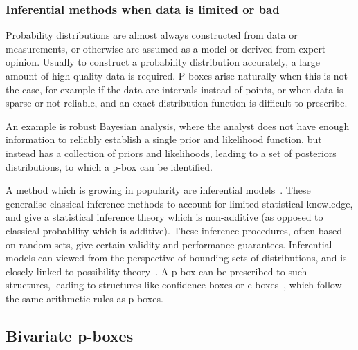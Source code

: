 \documentclass{juliacon}
\begin{document}
\subsubsection{Inferential methods when data is limited or bad}
Probability distributions are almost always constructed from data or measurements, or otherwise are assumed as a model or derived from expert opinion. Usually to construct a probability distribution accurately, a large amount of high quality data is required. P-boxes arise naturally when this is not the case, for example if the data are intervals instead of points, or when data is sparse or not reliable, and an exact distribution function is difficult to prescribe.

An example is robust Bayesian analysis, where the analyst does not have enough information to reliably establish a single prior and likelihood function, but instead has a collection of priors and likelihoods, leading to a set of posteriors distributions, to which a p-box can be identified.

A method which is growing in popularity are inferential models~\cite{martin2015inferential}. These generalise classical inference methods to account for limited statistical knowledge, and give a statistical inference theory which is non-additive (as opposed to classical probability which is additive). These inference procedures, often based on random sets, give certain validity and performance guarantees. Inferential models can viewed from the perspective of bounding sets of distributions, and is closely linked to possibility theory~\cite{liu2020inferential}. A p-box can be prescribed to such structures, leading to structures like confidence boxes or c-boxes~\cite{fersoncomputing}, which follow the same arithmetic rules as p-boxes. 

\subsection{Bivariate p-boxes}
\end{document}
